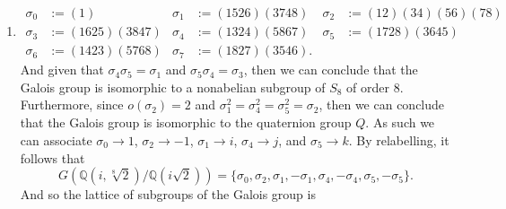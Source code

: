 \documentclass[12pt]{article}
\makeatletter
\theoremstyle{definition}
\theoremstyle{remark}
\newenvironment{solution}[1][\bf{\textit{Solution}}]{\par
  
  \normalfont \topsep6\p@\@plus6\p@\relax
  \list{}{\leftmargin=0mm
          \rightmargin=4mm
          \settowidth{\itemindent}{\itshape#1}%
          \labelwidth=\itemindent
          \parsep=0pt \listparindent=\parindent 
  }
  \item[\hskip\labelsep
        \itshape
    #1\@addpunct{.}]\ignorespaces
}{%
  \popQED\endlist\@endpefalse
}
\makeatother
\begin{document}
\begin{enumerate}[leftmargin=*]
\begin{enumerate}
\begin{solution}
                            \begin{align*}
                                \sigma_0&:=(1) & \sigma_1&:=(1526)(3748) & \sigma_2&:=(12)(34)(56)(78) \\
                                \sigma_3&:=(1625)(3847) & \sigma_4&:=(1324)(5867) & \sigma_5&:=(1728)(3645) \\
                                \sigma_6&:=(1423)(5768) & \sigma_7&:=(1827)(3546).
                            \end{align*}
                        And given that $\sigma_4\sigma_5=\sigma_1$ and $\sigma_5\sigma_4=\sigma_3$, then we can conclude that the Galois group is isomorphic to a nonabelian subgroup of $S_8$ of order 8. Furthermore, since $o(\sigma_2)=2$ and $\sigma_1^2=\sigma_4^2=\sigma_5^2=\sigma_2$, then we can conclude that the Galois group is isomorphic to the quaternion group $Q$. As such we can associate $\sigma_0\rightarrow 1$, $\sigma_2\rightarrow -1$, $\sigma_1\rightarrow i$, $\sigma_4\rightarrow j$, and $\sigma_5\rightarrow k$. By relabelling, it follows that 
                            \begin{equation*}
                                G(\mathbb{Q}(i,\sqrt[8]{2})/\mathbb{Q}(i\sqrt{2}))=\{\sigma_0,\sigma_2,\sigma_1,-\sigma_1,\sigma_4,-\sigma_4,\sigma_5,-\sigma_5\}.
                            \end{equation*}
                        And so the lattice of subgroups of the Galois group is
                            \begin{center}
\end{center}
\end{solution}
\end{enumerate}
\end{enumerate}
\end{document}
